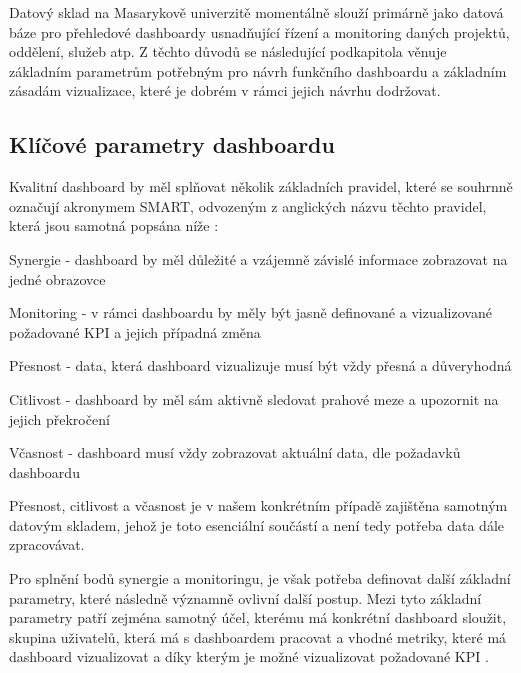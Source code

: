 \documentclass[
  digital,     %
  twoside,     %
  lof,         %
  lot,         %
]{fithesis4}
\begin{document}
Datový sklad na Masarykově univerzitě momentálně slouží primárně jako datová báze pro přehledové dashboardy usnadňující řízení a monitoring daných projektů, oddělení, služeb atp. Z těchto důvodů se následující podkapitola věnuje základním parametrům potřebným pro návrh funkčního dashboardu a základním zásadám vizualizace, které je dobrém v rámci jejich návrhu dodržovat.

\subsection{Klíčové parametry dashboardu}
Kvalitní dashboard by měl splňovat několik základních pravidel, které se souhrnně označují akronymem SMART, odvozeným z anglických názvu těchto pravidel, která jsou samotná popsána níže \parencite[s.~1]{Kratochvil2014}:
\begin{compactitem}
    \item Synergie - dashboard by měl důležité a vzájemně závislé informace zobrazovat na jedné obrazovce
    \item Monitoring - v rámci dashboardu by měly být jasně definované a vizualizované požadované KPI a jejich případná změna
    \item Přesnost - data, která dashboard vizualizuje musí být vždy přesná a důveryhodná
    \item Citlivost - dashboard by měl sám aktivně sledovat prahové meze a upozornit na jejich překročení
    \item Včasnost - dashboard musí vždy zobrazovat aktuální data, dle požadavků dashboardu
\end{compactitem}
Přesnost, citlivost a včasnost je v našem konkrétním případě zajištěna samotným datovým skladem, jehož je toto esenciální součástí a není tedy potřeba data dále zpracovávat. 

Pro splnění bodů synergie a monitoringu, je však potřeba definovat další základní parametry, které následně významně ovlivní další postup. Mezi tyto základní parametry patří zejména samotný účel, kterému má konkrétní dashboard sloužit, skupina uživatelů, která má s dashboardem pracovat a vhodné metriky, které má dashboard vizualizovat a díky kterým je možné vizualizovat požadované KPI \parencite[s.~6]{Faron2016thesis}. 
\end{document}

